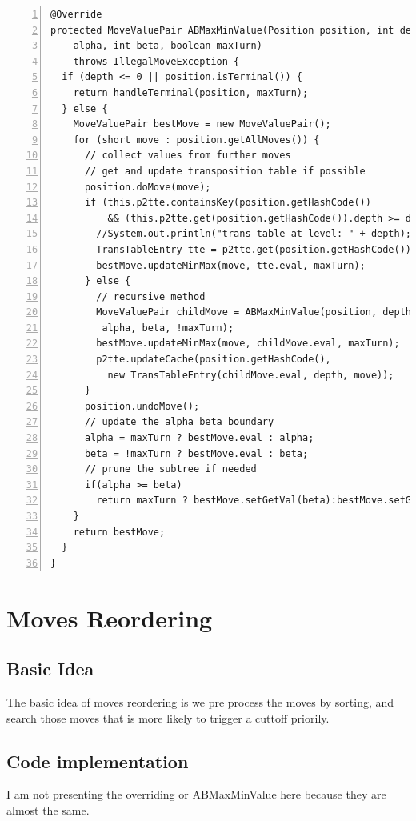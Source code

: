 \documentclass{article}
\begin{document}
\begin{lstlisting}[numbers=left]
@Override
protected MoveValuePair ABMaxMinValue(Position position, int depth, int  
    alpha, int beta, boolean maxTurn)
    throws IllegalMoveException {
  if (depth <= 0 || position.isTerminal()) {
    return handleTerminal(position, maxTurn);
  } else {
    MoveValuePair bestMove = new MoveValuePair();
    for (short move : position.getAllMoves()) {
      // collect values from further moves
      // get and update transposition table if possible
      position.doMove(move);
      if (this.p2tte.containsKey(position.getHashCode())
          && (this.p2tte.get(position.getHashCode()).depth >= depth)) {
        //System.out.println("trans table at level: " + depth);
        TransTableEntry tte = p2tte.get(position.getHashCode());
        bestMove.updateMinMax(move, tte.eval, maxTurn);
      } else {
        // recursive method
        MoveValuePair childMove = ABMaxMinValue(position, depth - 1,
         alpha, beta, !maxTurn);
        bestMove.updateMinMax(move, childMove.eval, maxTurn);
        p2tte.updateCache(position.getHashCode(), 
          new TransTableEntry(childMove.eval, depth, move));
      }
      position.undoMove();
      // update the alpha beta boundary
      alpha = maxTurn ? bestMove.eval : alpha;
      beta = !maxTurn ? bestMove.eval : beta;
      // prune the subtree if needed
      if(alpha >= beta)
        return maxTurn ? bestMove.setGetVal(beta):bestMove.setGetVal(alpha);
    }
    return bestMove;
  }
}
\end{lstlisting}














\clearpage
\section{Moves Reordering}
\subsection{Basic Idea}
The basic idea of moves reordering is we pre process the moves by sorting, and search those moves that is more likely to trigger a cuttoff priorily.



\subsection{Code implementation}
I am not presenting the overriding or ABMaxMinValue here because they are almost the same.
\end{document}
